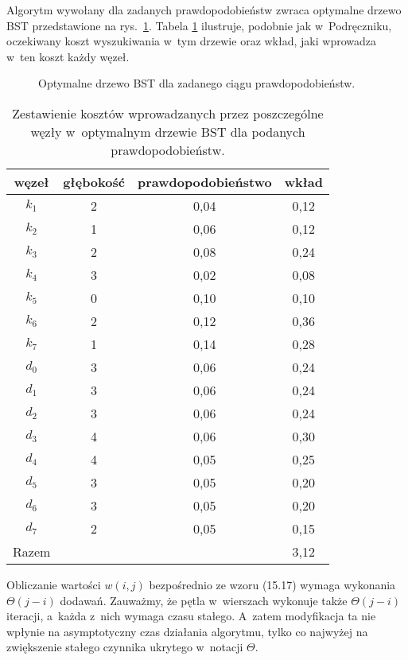 \exercise %
Algorytm  wywołany dla zadanych prawdopodobieństw zwraca optymalne drzewo BST przedstawione na rys.\ \ref{fig:15.5-2}.
Tabela \ref{tab:15.5-2} ilustruje, podobnie jak w~Podręczniku, oczekiwany koszt wyszukiwania w~tym drzewie oraz wkład, jaki wprowadza w~ten koszt każdy węzeł.
\begin{figure}[!ht]
	\centering 
	\caption{Optymalne drzewo BST dla zadanego ciągu prawdopodobieństw.} \label{fig:15.5-2}
\end{figure}
\begin{table}[!ht]
	\centering
		\begin{tabular}{cccc}
			węzeł & głębokość & prawdopodobieństwo & wkład \\ \hline
			$k_1$ & 2 & 0{,}04 & 0{,}12 \\
			$k_2$ & 1 & 0{,}06 & 0{,}12 \\
			$k_3$ & 2 & 0{,}08 & 0{,}24 \\
			$k_4$ & 3 & 0{,}02 & 0{,}08 \\
			$k_5$ & 0 & 0{,}10 & 0{,}10 \\
			$k_6$ & 2 & 0{,}12 & 0{,}36 \\
			$k_7$ & 1 & 0{,}14 & 0{,}28 \\
			$d_0$ & 3 & 0{,}06 & 0{,}24 \\
			$d_1$ & 3 & 0{,}06 & 0{,}24 \\
			$d_2$ & 3 & 0{,}06 & 0{,}24 \\
			$d_3$ & 4 & 0{,}06 & 0{,}30 \\
			$d_4$ & 4 & 0{,}05 & 0{,}25 \\
			$d_5$ & 3 & 0{,}05 & 0{,}20 \\
			$d_6$ & 3 & 0{,}05 & 0{,}20 \\
			$d_7$ & 2 & 0{,}05 & 0{,}15 \\ \hline
			Razem & & & 3{,}12
		\end{tabular} \caption{Zestawienie kosztów wprowadzanych przez poszczególne węzły w~optymalnym drzewie BST dla podanych prawdopodobieństw.} \label{tab:15.5-2}
\end{table}

\exercise %
Obliczanie wartości $w(i,j)$ bezpośrednio ze wzoru (15.17) wymaga wykonania $\Theta(j-i)$ dodawań.
Zauważmy, że pętla  w~wierszach  wykonuje także $\Theta(j-i)$ iteracji, a~każda z~nich wymaga czasu stałego.
A~zatem modyfikacja ta nie wpłynie na asymptotyczny czas działania algorytmu, tylko co najwyżej na zwiększenie stałego czynnika ukrytego w~notacji $\Theta$.


